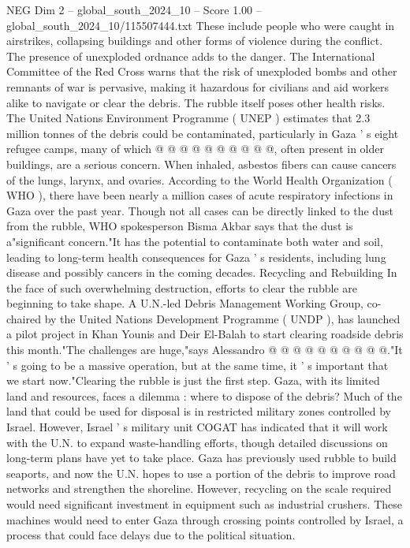 \begin{textsample}{NEG Dim 2 – global\_south\_2024\_10 – Score 1.00 – global\_south\_2024\_10/115507444.txt}
These include people who were caught in airstrikes, collapsing buildings and other forms of violence during the conflict.
The presence of unexploded ordnance adds to the danger.
The International Committee of the Red Cross warns that the risk of unexploded bombs and other remnants of war is pervasive, making it hazardous for civilians and aid workers alike to navigate or clear the debris.
The rubble itself poses other health risks.
The United Nations Environment Programme ( UNEP ) estimates that 2.3 million tonnes of the debris could be contaminated, particularly in Gaza ' s eight refugee camps, many of which @ @ @ @ @ @ @ @ @ @, often present in older buildings, are a serious concern.
When inhaled, asbestos fibers can cause cancers of the lungs, larynx, and ovaries.
According to the World Health Organization ( WHO ), there have been nearly a million cases of acute respiratory infections in Gaza over the past year.
Though not all cases can be directly linked to the dust from the rubble, WHO spokesperson Bisma Akbar says that the dust is a"significant concern."It has the potential to contaminate both water and soil, leading to long-term health consequences for Gaza ' s residents, including lung disease and possibly cancers in the coming decades.
Recycling and Rebuilding In the face of such overwhelming destruction, efforts to clear the rubble are beginning to take shape.
A U.N.-led Debris Management Working Group, co-chaired by the United Nations Development Programme ( UNDP ), has launched a pilot project in Khan Younis and Deir El-Balah to start clearing roadside debris this month."The challenges are huge,"says Alessandro @ @ @ @ @ @ @ @ @ @."It ' s going to be a massive operation, but at the same time, it ' s important that we start now."Clearing the rubble is just the first step.
Gaza, with its limited land and resources, faces a dilemma : where to dispose of the debris?
Much of the land that could be used for disposal is in restricted military zones controlled by Israel.
However, Israel ' s military unit COGAT has indicated that it will work with the U.N. to expand waste-handling efforts, though detailed discussions on long-term plans have yet to take place.
Gaza has previously used rubble to build seaports, and now the U.N. hopes to use a portion of the debris to improve road networks and strengthen the shoreline.
However, recycling on the scale required would need significant investment in equipment such as industrial crushers.
These machines would need to enter Gaza through crossing points controlled by Israel, a process that could face delays due to the political situation.

\end{textsample}
